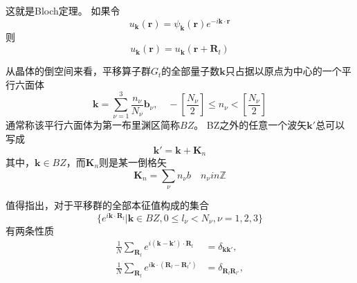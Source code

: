 这就是Bloch定理。
如果令
\begin{equation}
    u_\mathbf{k}(\mathbf{r}) = \psi_\mathbf{k}(\mathbf{r}) e^{-i\mathbf{k}\cdot \mathbf{r}}
\end{equation}
则
\begin{equation}
    u_\mathbf{k}(\mathbf{r}) = u_\mathbf{k}(\mathbf{r}+ \mathbf{R}_l)
\end{equation}
\par 从晶体的倒空间来看，平移算子群$G_t$的全部量子数$\mathbf{k}$只占据以原点为中心的一个平行六面体
\begin{equation}
    \mathbf{k} = \sum_{\nu = 1}^3 \frac{n_\nu}{N_\nu}\mathbf{b}_\nu,\quad -\left[\frac{N_\nu}{2}\right] \le n_\nu < \left[\frac{N_\nu}{2}\right]
\end{equation}
通常称该平行六面体为第一布里渊区简称$BZ$。
BZ之外的任意一个波矢$\mathbf{k}'$总可以写成
\begin{equation}
    \mathbf{k}' =\mathbf{k} + \mathbf{K}_n
\end{equation}
其中，$\mathbf{k} \in BZ$，而$\mathbf{K}_n$则是某一倒格矢
\begin{equation}
    \mathbf{K}_n = \sum_\nu n_\nu b \quad n_\nu in \mathbb{Z}
\end{equation}
\par 值得指出，对于平移群的全部本征值构成的集合
\begin{equation}
    \{e^{i\mathbf{k}\cdot \mathbf{R}_l}| \mathbf{k} \in BZ, 0 \le l_\nu < N_\nu, \nu = 1,2,3\}
\end{equation}
有两条性质
\begin{align}
    \frac{1}{N}\sum_{\mathbf{R}_l} e^{i(\mathbf{k}- \mathbf{k'})\cdot \mathbf{R}_l} &= \delta_{\mathbf{kk}'},\\
    \frac{1}{N}\sum_{\mathbf{R}_l} e^{i\mathbf{k}\cdot (\mathbf{R}_l - \mathbf{R}_l')} &= \delta_{\mathbf{R}_l\mathbf{R}_{l'}},
\end{align}
